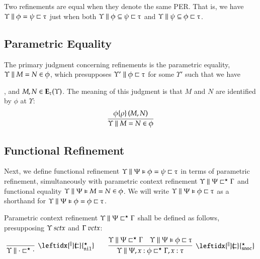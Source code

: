 \documentclass[11pt]{article}
\theoremstyle{definition}
\theoremstyle{remark}
\numberwithin{equation}{section}
\def\IModeColorName{MidnightBlue}
\def\OModeColorName{Maroon}
\def\IModeColorName{Black}
\def\OModeColorName{Black}
\newcommand\IMode[1]{{\color{\IModeColorName}{#1}}}
\newcommand\OMode[1]{{\color{\OModeColorName}{#1}}}
\newcommand\Member[2]{\IMode{#1}\in\IMode{#2}}
\newcommand\IsVarCtx[1]{\IMode{#1}\ \textit{vctx}}
\newcommand\IsSymCtx[1]{\IMode{#1}\ \textit{sctx}}
\newcommand\Refines[3]{\IMode{#1}\parallel\IMode{#2}\sqsubset\OMode{#3}}
\newcommand\EqRefines[4]{\IMode{#1}\parallel\IMode{#2}=\IMode{#3}\sqsubset\OMode{#4}}
\newcommand\HRefines[4]{\IMode{#1}\parallel\IMode{#2}\vDash\IMode{#3}\sqsubset\OMode{#4}}
\newcommand\HEqRefines[5]{\IMode{#1}\parallel\IMode{#2}\vDash\IMode{#3}=\IMode{#4}\sqsubset\OMode{#5}}
\newcommand\PRefinesCtx[3]{\IMode{#1}\parallel\IMode{#2}\sqsubset^\star\OMode{#3}}
\newcommand\RMemEq[4]{\IMode{#1}\parallel\IMode{#2}=\IMode{#3}\in\IMode{#4}}
\newcommand\HRMemEq[5]{\IMode{#1}\parallel\IMode{#2}\vDash\IMode{#3}=\IMode{#4}\in\IMode{#5}}
\newcommand\SubRefines[4]{\IMode{#1}\parallel\IMode{#2}\subseteq\IMode{#3}\sqsubset\OMode{#4}}
\newcommand\Exprs{\mathbf{E}}
\begin{document}
Two refinements are equal when they denote the same PER. That is, we have
$\EqRefines{\Upsilon}{\phi}{\psi}{\tau}$ just when both
$\SubRefines{\Upsilon}{\phi}{\psi}{\tau}$ and
$\SubRefines{\Upsilon}{\psi}{\phi}{\tau}$.

\subsection{Parametric Equality}

The primary judgment concerning refinements is the parametric equality,
$\RMemEq{\Upsilon}{M}{N}{\phi}$, which presupposes
$\Refines{\Upsilon'}{\phi}{\tau}$ for some $\Upsilon'$ such that we have
,
and $\Member{M,N}{\Exprs_\tau(\Upsilon)}$. The meaning of this judgment is
that $M$ and $N$ are identified by $\phi$ at $\Upsilon$:
\[
  \infer{
    \RMemEq{\Upsilon}{M}{N}{\phi}
  }{
    \RefEquate{\phi}{\rho}{M}{N}
  }
\]

\subsection{Functional Refinement}

\newcommand\PRefinesCtxNil{\leftidx{^\parallel}{\!\!\sqsubset}{^\star_{\mathtt{nil}}}}
\newcommand\PRefinesCtxSnoc{\leftidx{^\parallel}{\!\!\sqsubset}{^\star_{\mathtt{snoc}}}}

Next, we define functional refinement
$\HEqRefines{\Upsilon}{\Psi}{\phi}{\psi}{\tau}$ in terms of parametric refinement,
simultaneously with parametric context refinement
$\PRefinesCtx{\Upsilon}{\Psi}{\Gamma}$ and functional equality
$\HRMemEq{\Upsilon}{\Psi}{M}{N}{\phi}$. We will write
$\HRefines{\Upsilon}{\Psi}{\phi}{\tau}$ as a shorthand for
$\HEqRefines{\Upsilon}{\Psi}{\phi}{\phi}{\tau}$.

\newcommand\DefPRefinesCtxNil[1]{
  \infer[\PRefinesCtxNil]{
    \PRefinesCtx{#1}{\cdot}{\cdot}
  }{
  }
}
\newcommand\DefPRefinesCtxSnoc[6]{
  \infer[\PRefinesCtxSnoc]{
    \PRefinesCtx{#1}{#2,#3:#4}{#5,#3:#6}
  }{
    \PRefinesCtx{#1}{#2}{#5} &
    \HRefines{#1}{#2}{#4}{#6}
  }
}

Parametric context refinement $\PRefinesCtx{\Upsilon}{\Psi}{\Gamma}$ shall be
defined as follows, presupposing $\IsSymCtx{\Upsilon}$ and
$\IsVarCtx{\Gamma}$:
\begin{gather*}
  \DefPRefinesCtxNil{\Upsilon}\qquad
  \DefPRefinesCtxSnoc{\Upsilon}{\Psi}{x}{\phi}{\Gamma}{\tau}
\end{gather*}
\end{document}
